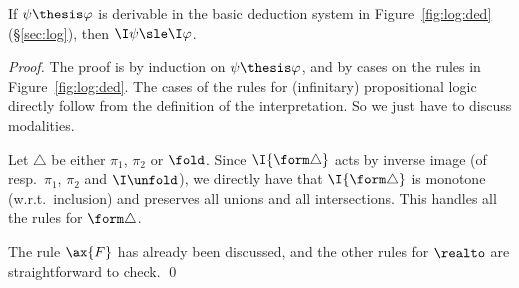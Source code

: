 \begin{proposition}
\label{prop:proof:sem:sound:ded}
If $\psi \thesis \varphi$ is derivable in the basic deduction system 
in Figure~\ref{fig:log:ded} (\S\ref{sec:log}),
then $\I\psi \sle \I\varphi$.
\end{proposition}

\begin{proof}
The proof is by induction on $\psi \thesis \varphi$,
and by cases on the rules in Figure~\ref{fig:log:ded}.
The cases of the rules for (infinitary) propositional
logic directly follow from the definition of the interpretation.
So we just have to discuss modalities.

Let $\triangle$ be either $\pi_1$, $\pi_2$ or $\fold$.
Since $\I{\form\triangle}$ acts by inverse image
(of resp.\ $\pi_1$, $\pi_2$ and $\I\unfold$), we directly
have that $\I{\form\triangle}$
is monotone (w.r.t.\ inclusion) and preserves all unions and all intersections.
This handles all the rules for $\form\triangle$.

The rule $\ax{F}$ has already been discussed,
and the other rules for $\realto$ are straightforward to check.
\qed
\end{proof}




